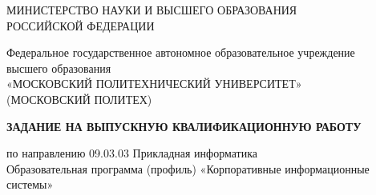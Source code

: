 \begingroup
\pagestyle{empty}
\thispagestyle{empty}
\setlength{\parindent}{0pt}
\renewcommand{\arraystretch}{1.15}
\setlength{\tabcolsep}{4pt}
\setlength{\arrayrulewidth}{0.7pt}

\providecommand{\wk}{\cellcolor{black}}
\providecommand{\blankwk}{}

\newlength{\assignmentlabelwidth}
\newlength{\assignmentvaluewidth}
\newlength{\assignmentfullwidth}
\setlength{\assignmentlabelwidth}{52mm}
\setlength{\assignmentvaluewidth}{\dimexpr\textwidth-\assignmentlabelwidth-6\tabcolsep-3\arrayrulewidth\relax}
\setlength{\assignmentfullwidth}{\dimexpr\textwidth-2\tabcolsep-2\arrayrulewidth\relax}

\begin{center}
\small
МИНИСТЕРСТВО НАУКИ И ВЫСШЕГО ОБРАЗОВАНИЯ\\
РОССИЙСКОЙ ФЕДЕРАЦИИ

\vspace{4pt}

Федеральное государственное автономное образовательное учреждение\\
высшего образования\\
«МОСКОВСКИЙ ПОЛИТЕХНИЧЕСКИЙ УНИВЕРСИТЕТ»\\
(МОСКОВСКИЙ ПОЛИТЕХ)

\vspace{6pt}

\textbf{ЗАДАНИЕ НА ВЫПУСКНУЮ КВАЛИФИКАЦИОННУЮ РАБОТУ}

\vspace{4pt}

по направлению 09.03.03 Прикладная информатика\\
Образовательная программа (профиль) «Корпоративные информационные системы»
\end{center}

\vspace{4pt}

